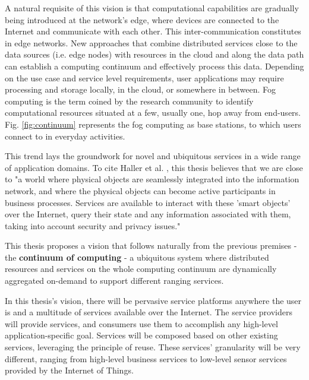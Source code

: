 A natural requisite of this vision is that computational capabilities are gradually being introduced at the network's edge, where devices are connected to the Internet and communicate with each other. This inter-communication constitutes in edge networks. New approaches that combine distributed services close to the data sources (i.e. edge nodes) with resources in the cloud and along the data path can establish a computing continuum and effectively process this data. Depending on the use case and service level requirements, user applications may require processing and storage locally, in the cloud, or somewhere in between. Fog computing \cite{fog-computing} is the term coined by the research community to identify computational resources situated at a few, usually one, hop away from end-users. Fig. \ref{fig:continuum} represents the fog computing as base stations, to which users connect to in everyday activities.

This trend lays the groundwork for novel and ubiquitous services in a wide range of application domains. To cite Haller et al. \cite{iot-enterprise}, this thesis believes that we are close to "a world where physical objects are seamlessly integrated into the information network, and where the physical objects can become active participants in business processes. Services are available to interact with these 'smart objects' over the Internet, query their state and any information associated with them, taking into account security and privacy issues."

This thesis proposes a vision that follows naturally from the previous premises - the \textbf{continuum of computing} - a ubiquitous system where distributed resources and services on the whole computing continuum are dynamically aggregated on-demand to support different ranging services.

In this thesis's vision, there will be pervasive service platforms anywhere the user is and a multitude of services available over the Internet. The service providers will provide services, and consumers use them to accomplish any high-level application-specific goal. Services will be composed based on other existing services, leveraging the principle of reuse. These services' granularity will be very different, ranging from high-level business services to low-level sensor services provided by the Internet of Things.

